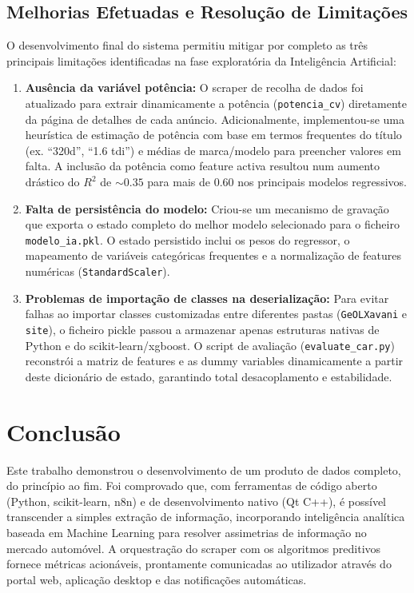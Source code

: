 \documentclass[11pt,a4paper]{article}
\begin{document}
\subsection{Melhorias Efetuadas e Resolução de Limitações}
O desenvolvimento final do sistema permitiu mitigar por completo as três principais limitações identificadas na fase exploratória da Inteligência Artificial:
\begin{enumerate}
    \item \textbf{Ausência da variável potência:} O scraper de recolha de dados foi atualizado para extrair dinamicamente a potência (\texttt{potencia\_cv}) diretamente da página de detalhes de cada anúncio. Adicionalmente, implementou-se uma heurística de estimação de potência com base em termos frequentes do título (ex. ``320d'', ``1.6 tdi'') e médias de marca/modelo para preencher valores em falta. A inclusão da potência como feature activa resultou num aumento drástico do $R^2$ de $\sim 0.35$ para mais de $0.60$ nos principais modelos regressivos.
    \item \textbf{Falta de persistência do modelo:} Criou-se um mecanismo de gravação que exporta o estado completo do melhor modelo selecionado para o ficheiro \texttt{modelo\_ia.pkl}. O estado persistido inclui os pesos do regressor, o mapeamento de variáveis categóricas frequentes e a normalização de features numéricas (\texttt{StandardScaler}).
    \item \textbf{Problemas de importação de classes na deserialização:} Para evitar falhas ao importar classes customizadas entre diferentes pastas (\texttt{GeOLXavani} e \texttt{site}), o ficheiro pickle passou a armazenar apenas estruturas nativas de Python e do scikit-learn/xgboost. O script de avaliação (\texttt{evaluate\_car.py}) reconstrói a matriz de features e as dummy variables dinamicamente a partir deste dicionário de estado, garantindo total desacoplamento e estabilidade.
\end{enumerate}

\section{Conclusão}
Este trabalho demonstrou o desenvolvimento de um produto de dados completo, do princípio ao fim. Foi comprovado que, com ferramentas de código aberto (Python, scikit-learn, n8n) e de desenvolvimento nativo (Qt C++), é possível transcender a simples extração de informação, incorporando inteligência analítica baseada em Machine Learning para resolver assimetrias de informação no mercado automóvel. A orquestração do scraper com os algoritmos preditivos fornece métricas acionáveis, prontamente comunicadas ao utilizador através do portal web, aplicação desktop e das notificações automáticas.
\end{document}
